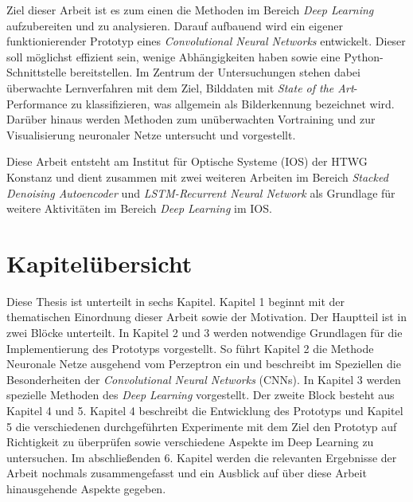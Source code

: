 Ziel dieser Arbeit ist es zum einen die Methoden im Bereich \textit{Deep Learning} aufzubereiten und zu analysieren. Darauf aufbauend wird ein eigener funktionierender Prototyp eines \textit{Convolutional Neural Networks} entwickelt. Dieser soll möglichst effizient sein, wenige Abhängigkeiten haben sowie eine Python-Schnittstelle bereitstellen. Im Zentrum der Untersuchungen stehen dabei überwachte Lernverfahren mit dem Ziel, Bilddaten mit \textit{State of the Art}-Performance zu klassifizieren, was allgemein als Bilderkennung bezeichnet wird. Darüber hinaus werden Methoden zum unüberwachten Vortraining und zur Visualisierung neuronaler Netze untersucht und vorgestellt.


Diese Arbeit entsteht am Institut für Optische Systeme (IOS) der HTWG Konstanz und dient zusammen mit zwei weiteren Arbeiten im Bereich \textit{Stacked Denoising Autoencoder} und \textit{LSTM-Recurrent Neural Network} als Grundlage für weitere Aktivitäten im Bereich \textit{Deep Learning} im IOS.


\section{Kapitelübersicht}
Diese Thesis ist unterteilt in sechs Kapitel. Kapitel 1 beginnt mit der thematischen Einordnung dieser Arbeit sowie der Motivation. Der Hauptteil ist in zwei Blöcke unterteilt. In Kapitel 2 und 3 werden notwendige Grundlagen für die Implementierung des Prototyps vorgestellt. So führt Kapitel 2 die Methode Neuronale Netze ausgehend vom Perzeptron ein und beschreibt im Speziellen die Besonderheiten der \textit{Convolutional Neural Networks} (CNNs). In Kapitel 3 werden spezielle Methoden des \textit{Deep Learning} vorgestellt. Der zweite Block besteht aus Kapitel 4 und 5. Kapitel 4 beschreibt die Entwicklung des Prototyps und Kapitel 5 die verschiedenen durchgeführten Experimente mit dem Ziel den Prototyp auf Richtigkeit zu überprüfen sowie verschiedene Aspekte im Deep Learning zu untersuchen. Im abschließenden 6. Kapitel werden die relevanten Ergebnisse der Arbeit nochmals zusammengefasst und ein Ausblick auf über diese Arbeit hinausgehende Aspekte gegeben.

